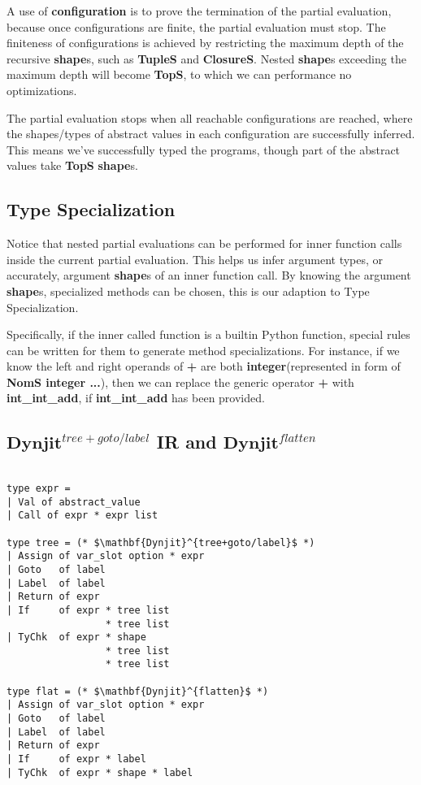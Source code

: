 \documentclass[conference]{IEEEtran}
\begin{document}
A use of \textbf{configuration} is to prove the termination of the partial evaluation,
because once configurations are finite, the partial evaluation must stop.
The finiteness of configurations is achieved by restricting the maximum depth of the recursive \textbf{shape}s, such as \textbf{TupleS} and \textbf{ClosureS}.
Nested \textbf{shape}s exceeding the maximum depth will become \textbf{TopS}, to which we can performance no optimizations.

The partial evaluation stops when all reachable configurations are reached, where the shapes/types of abstract values
in each configuration are successfully inferred. This means we've successfully typed the programs, though part of the abstract values take \textbf{TopS} \textbf{shape}s.

\subsection{Type Specialization}

Notice that nested partial evaluations can be performed for inner function calls inside the current partial evaluation.
This helps us infer argument types, or accurately, argument \textbf{shape}s of an inner function call.
By knowing the argument \textbf{shape}s, specialized methods can be chosen, this is our adaption to Type Specialization.

Specifically, if the inner called function is a builtin Python function, special rules can be written for them to generate
method specializations. For instance, if we know the left and right operands of
 \textbf{+} are both \textbf{integer}(represented in form of \textbf{NomS integer ...}),
then we can replace the generic operator \textbf{+} with \textbf{int\_int\_add}, if \textbf{int\_int\_add} has been provided.

\subsection{$\mathbf{Dynjit}^{tree+goto/label}$ IR and $\mathbf{Dynjit}^{flatten}$}

\lstset{language=Caml, showlines=true, mathescape=true}
\begin{lstlisting}[caption=Dynjit IRs]

type expr =
| Val of abstract_value
| Call of expr * expr list

type tree = (* $\mathbf{Dynjit}^{tree+goto/label}$ *)
| Assign of var_slot option * expr
| Goto   of label
| Label  of label
| Return of expr
| If     of expr * tree list
                 * tree list
| TyChk  of expr * shape
                 * tree list
                 * tree list

type flat = (* $\mathbf{Dynjit}^{flatten}$ *)
| Assign of var_slot option * expr
| Goto   of label
| Label  of label
| Return of expr
| If     of expr * label
| TyChk  of expr * shape * label
\end{lstlisting}
\end{document}
